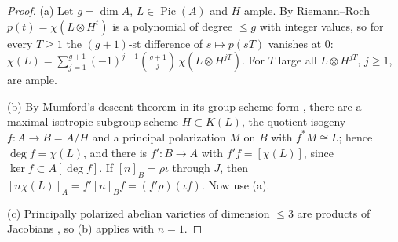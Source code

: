 \documentclass[11pt,a4paper]{article}
\theoremstyle{definition}
\newcommand{\Pic}{\operatorname{Pic}}
\begin{document}
\begin{proof}
(a) Let $g=\dim A$, $L\in\Pic(A)$ and $H$ ample. By Riemann--Roch
$p(t)=\chi(L\otimes H^{t})$ is a polynomial of degree $\le g$ with integer
values, so for every $T\ge1$ the $(g+1)$-st difference of $s\mapsto p(sT)$
vanishes at $0$:
$\chi(L)=\sum_{j=1}^{g+1}(-1)^{j+1}\binom{g+1}{j}\,\chi(L\otimes H^{jT})$.
For $T$ large all $L\otimes H^{jT}$, $j\ge1$, are ample.

(b) By Mumford's descent theorem in its group-scheme form
\cite[\S23, Thm.~4 and Cor.~1, pp.~233--234]{Mu}, there are a maximal
isotropic subgroup scheme $H\subset K(L)$, the quotient isogeny $f\colon
A\to B=A/H$ and a principal polarization $M$ on $B$ with $f^*M\cong L$;
hence $\deg f=\chi(L)$, and there is $f'\colon B\to A$ with
$f'f=[\chi(L)]$, since $\ker f\subset A[\deg f]$. If $[n]_B=\rho\iota$
through $J$, then $[n\chi(L)]_A=f'[n]_Bf=(f'\rho)(\iota f)$. Now use (a).

(c) Principally polarized abelian varieties of dimension $\le3$ are
products of Jacobians \cite[Thm.~4]{OU}, so (b) applies with $n=1$.
\end{proof}
\end{document}
